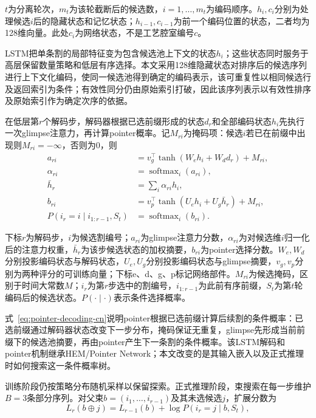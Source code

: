 \documentclass[final,5p,times,twocolumn]{elsarticle}
\begin{document}
$t$为分离轮次，$m_t$为该轮截断后的候选数，$i=1,\ldots,m_t$为编码顺序。$h_i,c_i$分别为处理候选$i$后的隐藏状态和记忆状态；$h_{i-1},c_{i-1}$为前一个编码位置的状态，二者均为128维向量。此处$c_i$为网络状态，不是工艺腔室编号$c$。


LSTM把单条割的局部特征变为包含候选池上下文的状态$h_i$；这些状态同时服务于高层保留数量策略和低层有序选择。本文采用128维隐藏状态对排序后的候选序列进行上下文化编码，使同一候选池得到确定的编码表示，该可重复性以相同候选行及返回索引为条件；有效性同分仍由原始索引打破，因此该序列表示以有效性排序及原始索引作为确定次序的依据。

在低层第$r$个解码步，解码器根据已选前缀形成的状态$d_r$和全部编码状态$h_i$先执行一次glimpse注意力，再计算pointer概率。记$M_{ri}$为掩码项：候选$i$若已在前缀中出现则$M_{ri}=-\infty$，否则为0，则
\begin{equation}
\begin{aligned}
a_{ri}&=v_g^\top\tanh(W_e h_i+W_d d_r)+M_{ri},\\
\alpha_{ri}&=\operatorname{softmax}_i(a_{ri}),\\
\bar h_r&=\sum_i\alpha_{ri}h_i,\\
b_{ri}&=v_p^\top\tanh(U_e h_i+U_g\bar h_r)+M_{ri},\\
P(i_r=i\mid i_{1:r-1},S_t)&=\operatorname{softmax}_i(b_{ri}).
\end{aligned}
\label{eq:pointer-decoding-cn}
\end{equation}

下标$r$为解码步，$i$为候选割编号；$a_{ri}$为glimpse注意力分数，$\alpha_{ri}$为对候选维$i$归一化后的注意力权重，$\bar h_r$为该步候选状态的加权摘要，$b_{ri}$为pointer选择分数。$W_e,W_d$分别投影编码状态与解码状态，$U_e,U_g$分别投影编码状态与glimpse摘要，$v_g,v_p$分别为两种评分的可训练向量；下标e、d、g、p标记网络部件。$M_{ri}$为候选掩码，区别于时间大常数$M$；$i_r$为第$r$步选中的割编号，$i_{1:r-1}$为此前有序前缀，$S_t$为第$t$轮编码后的候选状态。$P(\cdot\mid\cdot)$表示条件选择概率。


式~\eqref{eq:pointer-decoding-cn}说明pointer根据已选前缀计算后续割的条件概率：已选前缀通过解码器状态改变下一步分布，掩码保证无重复，glimpse先形成当前前缀下的候选池摘要，再由pointer产生下一条割的条件概率。该LSTM解码和pointer机制继承HEM/Pointer Network；本文改变的是其输入嵌入以及正式推理时如何搜索这一条件概率树。

训练阶段仍按策略分布随机采样以保留探索。正式推理阶段，束搜索在每一步维护$B=3$条部分序列。对父束$b=(i_1,\ldots,i_{r-1})$及其未选候选$j$，扩展分数为
\begin{equation}
L_r(b\oplus j)=L_{r-1}(b)+\log P(i_r=j\mid b,S_t),
\label{eq:beam-score-cn}
\end{equation}
\end{document}

